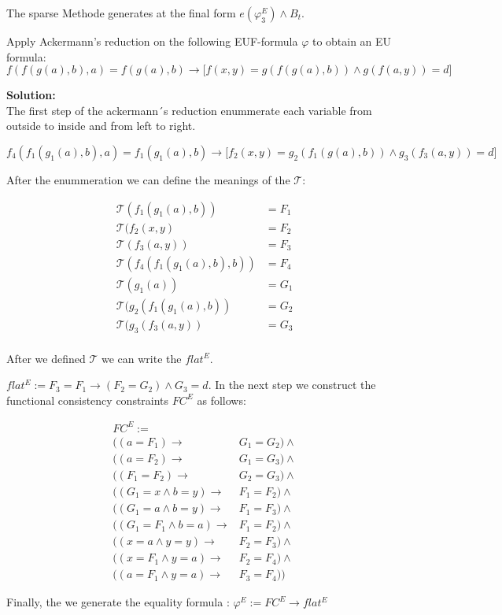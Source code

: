 \documentclass[11pt,a4paper]{uebung}
\newcommand{\solution}[1]{\par {\bf Solution:}\\#1}
\def\cT{\mathcal{T}}
\begin{document}
  The sparse Methode generates at the final form  $e(\varphi^E_3) \land B_t$.

  


\newpage
{}
Apply Ackermann's reduction on the following EUF-formula $\varphi$ to obtain
an EU formula:
\begin{displaymath}
  f\left(f\left(g\left(a\right),b\right),a\right) = f(g(a),b) \rightarrow \big[ f(x,y) = g(f(g(a),b)) \land
  g(f(a,y))=d \big]
\end{displaymath}


\solution{
  The first step of the ackermann´s reduction enummerate each variable from outside to inside and from left to right. 
 
 \begin{displaymath}
  f_4\left(f_1\left(g_1\left(a\right),b\right),a\right) = f_1(g_1(a),b) \rightarrow \big[ f_2(x,y) = g_2(f_1(g(a),b)) \land
   g_3(f_3(a,y))=d \big]
 \end{displaymath}

After the enummeration we can define the meanings of the $\cT$:

  \begin{align*}
   \cT (f_1(g_1(a),b)) &= F_1  \\
   \cT (f_2(x,y) &= F_2\\
    \cT (f_3(a,y)) &= F_3 \\
    \cT (f_4(f_1(g_1(a),b),b)) &= F_4 \\
    \cT (g_1(a)) &= G_1\\
    \cT (g_2(f_1(g_1(a),b)) &= G_2 \\
    \cT (g_3(f_3(a,y)) &= G_3  \\ 
  \end{align*}

After we defined $\cT$ we can write the $flat^E$.

$ flat^E:= F_3 = F_1 \rightarrow  (F_2 = G_2) \land G_3 = d $. 
In the next step we construct the functional consistency constraints $FC^E$ as follows:
 
 \begin{align*}
  FC^E := \\
    ((a = F_1) \rightarrow & G_1 = G_2) \land \\
     ((a = F_2) \rightarrow & G_1 = G_3) \land \\
      ((F_1 = F_2) \rightarrow & G_2 = G_3) \land \\
      ((G_1 = x \land b=y) \rightarrow & F_1 = F_2) \land \\
      ((G_1 = a \land b=y ) \rightarrow & F_1 = F_3) \land \\
      ((G_1 = F_1 \land b=a) \rightarrow & F_1 = F_2) \land \\
      ((x = a \land y=y) \rightarrow & F_2 = F_3) \land \\
      ((x= F_1 \land y=a) \rightarrow & F_2 = F_4) \land \\
      ((a = F_1 \land y=a) \rightarrow & F_3 = F_4))
 \end{align*}


Finally, the we generate the equality formula : $\varphi^E := FC^E \rightarrow flat^E$

}
\end{document}

